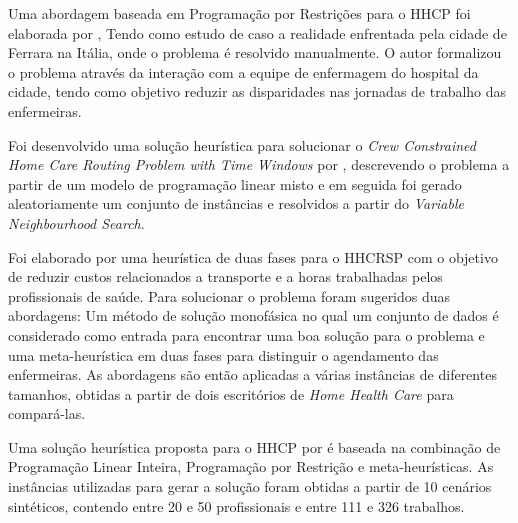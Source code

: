 Uma abordagem baseada em Programação por Restrições para o \ac{HHCP} foi elaborada por \cite{cattafi:2012}, Tendo como estudo de caso a realidade enfrentada pela cidade de Ferrara na Itália, onde o problema é resolvido manualmente. O autor formalizou o problema através da interação com a equipe de enfermagem do hospital da cidade, tendo como objetivo reduzir as disparidades nas jornadas de trabalho das enfermeiras.



Foi desenvolvido uma solução heurística para solucionar o \textit{Crew Constrained Home Care Routing Problem with Time Windows} por \cite{tozlu:2016}, descrevendo o problema a partir de um modelo de programação linear misto e em seguida foi gerado aleatoriamente um conjunto de instâncias e resolvidos a partir do \textit{Variable Neighbourhood Search}. 



Foi elaborado por \cite{Decerle:2016} uma heurística de duas fases para o \ac{HHCRSP} com o objetivo de reduzir custos relacionados a transporte e a horas trabalhadas pelos profissionais de saúde. Para solucionar o problema foram sugeridos duas abordagens: Um método de solução monofásica no qual um conjunto de dados é considerado como entrada para encontrar uma boa solução para o problema e uma meta-heurística em duas fases para distinguir o agendamento das enfermeiras. As abordagens são então aplicadas a várias instâncias de diferentes tamanhos, obtidas a partir de dois escritórios de \textit{Home Health Care} para compará-las.

Uma solução heurística proposta para o \ac{HHCP} por \cite{Bertels:2006} é baseada na combinação de Programação Linear Inteira, Programação por Restrição e meta-heurísticas. As instâncias utilizadas para gerar a solução foram obtidas a partir de 10 cenários sintéticos, contendo entre 20 e 50 profissionais e entre 111 e 326 trabalhos.

